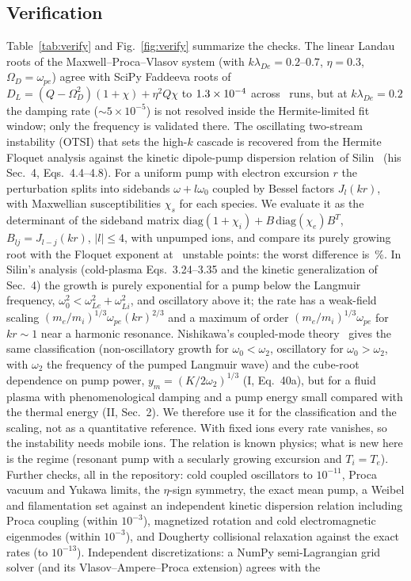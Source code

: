 \documentclass[aps,pre,reprint,floatfix,amsmath,amssymb,nofootinbib,superscriptaddress]{revtex4-2}
\newcommand{\wpe}{\omega_{pe}}
\begin{document}
\subsection{Verification}
\begin{table}[t]
\caption{Verification summary. Record files are listed under Data and code availability.}\label{tab:verify}
\small
\tabVerify
\end{table}
Table~\ref{tab:verify} and Fig.~\ref{fig:verify} summarize the checks. The linear Landau roots of the Maxwell--Proca--Vlasov system (with $k\lambda_{De}=0.2$--$0.7$, $\eta=0.3$, $\Omega_D=\wpe$) agree with SciPy Faddeeva roots of $D_L=(Q-\Omega_D^2)(1+\chi)+\eta^2Q\chi$ to $1.3\times10^{-4}$ across \bzeroNruns\ runs, but at $k\lambda_{De}=0.2$ the damping rate ($\sim5\times10^{-5}$) is not resolved inside the Hermite-limited fit window; only the frequency is validated there. The oscillating two-stream instability (OTSI) that sets the high-$k$ cascade is recovered from the Hermite Floquet analysis against the kinetic dipole-pump dispersion relation of Silin~\cite{Silin1965} (his Sec.~4, Eqs.~4.4--4.8). For a uniform pump with electron excursion $r$ the perturbation splits into sidebands $\omega+l\omega_0$ coupled by Bessel factors $J_l(kr)$, with Maxwellian susceptibilities $\chi_s$ for each species. We evaluate it as the determinant of the sideband matrix $\mathrm{diag}(1+\chi_i)+B\,\mathrm{diag}(\chi_e)B^{T}$, $B_{lj}=J_{l-j}(kr)$, $|l|\le4$, with unpumped ions, and compare its purely growing root with the Floquet exponent at \otsiN\ unstable points: the worst difference is \otsiMax\,\%. In Silin's analysis (cold-plasma Eqs.~3.24--3.35 and the kinetic generalization of Sec.~4) the growth is purely exponential for a pump below the Langmuir frequency, $\omega_0^2<\omega_{Le}^2+\omega_{Li}^2$, and oscillatory above it; the rate has a weak-field scaling $(m_e/m_i)^{1/3}\wpe(kr)^{2/3}$ and a maximum of order $(m_e/m_i)^{1/3}\wpe$ for $kr\sim1$ near a harmonic resonance. Nishikawa's coupled-mode theory~\cite{Nishikawa1968a,Nishikawa1968b} gives the same classification (non-oscillatory growth for $\omega_0<\omega_2$, oscillatory for $\omega_0>\omega_2$, with $\omega_2$ the frequency of the pumped Langmuir wave) and the cube-root dependence on pump power, $y_m=(K/2\omega_2)^{1/3}$ (I, Eq.~40a), but for a fluid plasma with phenomenological damping and a pump energy small compared with the thermal energy (II, Sec.~2). We therefore use it for the classification and the scaling, not as a quantitative reference. With fixed ions every rate vanishes, so the instability needs mobile ions. The relation is known physics; what is new here is the regime (resonant pump with a secularly growing excursion and $T_i=T_e$). Further checks, all in the repository: cold coupled oscillators to $10^{-11}$, Proca vacuum and Yukawa limits, the $\eta$-sign symmetry, the exact mean pump, a Weibel and filamentation set against an independent kinetic dispersion relation including Proca coupling (within $10^{-3}$), magnetized rotation and cold electromagnetic eigenmodes (within $10^{-3}$), and Dougherty collisional relaxation against the exact rates (to $10^{-13}$). Independent discretizations: a NumPy semi-Lagrangian grid solver (and its Vlasov--Ampere--Proca extension) agrees with the 
\end{document}
